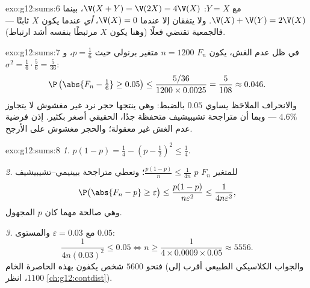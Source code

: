 \begin{solution}{exo:g12:sums:6}
مع $Y = X$: $\V(X + Y) = \V(2X) = 4\V(X)$، بينما
$\V(X) + \V(Y) = 2\V(X)$. ولا يتفقان إلا عندما $\V(X) = 0$، \emph{أي}
عندما يكون $X$ ثابتًا --- فالجمعية تقتضي  فعلًا
(وهنا يكون $X$ مرتبطًا بنفسه أشد ارتباط).
\end{solution}

\begin{solution}{exo:g12:sums:7}
في ظل عدم الغش، يكون $F_n$  $n = 1200$ متغير برنولي حيث
$p = \frac16$، و $\sigma^2 = \frac16\cdot\frac56 = \frac{5}{36}$:
\[
\P\left(\abs{F_n - \tfrac16} \geq 0.05\right)
\leq \frac{5/36}{1200 \times 0.0025} = \frac{5}{108} \approx 0.046 .
\]
والانحراف الملاحَظ يساوي $0.05$ بالضبط: وهي  ينتجها حجر نرد غير مغشوش
 لا يتجاوز $4.6\%$ --- وبما أن متراجحة تشيبيشيف متحفظة
جدًا،  الحقيقي أصغر بكثير. إذن فرضية عدم الغش
غير معقولة؛ والحجر مغشوش على الأرجح.
\end{solution}

\begin{solution}{exo:g12:sums:8}
\emph{1.} $p(1-p) = \frac14 - \left(p - \frac12\right)^2 \leq \frac14$.

\emph{2.} للمتغير $F_n$  $p$ 
$\frac{p(1-p)}{n} \leq \frac{1}{4n}$؛ وتعطي متراجحة بيينيمي--تشيبيشيف
\[
\P\bigl(\abs{F_n - p} \geq \varepsilon\bigr)
\leq \frac{p(1-p)}{n\varepsilon^2} \leq \frac{1}{4n\varepsilon^2},
\]
وهي صالحة مهما كان $p$ المجهول.

\emph{3.} مع $\varepsilon = 0.03$ والمستوى $0.05$:
\[
\frac{1}{4n(0.03)^2} \leq 0.05
\iff n \geq \frac{1}{4 \times 0.0009 \times 0.05} \approx 5556 .
\]
فنحو $5600$ شخص يكفون بهذه الحاصرة الخام (والجواب الكلاسيكي
 الطبيعي أقرب إلى $1100$، انظر
\cref{ch:g12:contdist}).
\end{solution}

